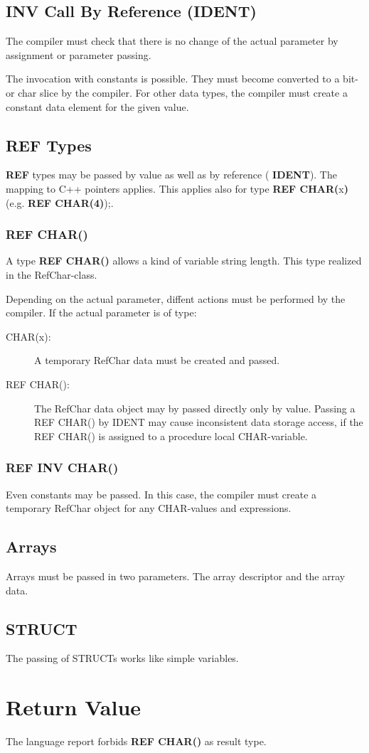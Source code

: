 \subsection{INV Call By Reference (IDENT)}
\label{sec_inv_ident}
The compiler must check that there is no change of the actual parameter
by assignment or parameter passing.

The invocation with constants is possible. They must become converted 
to a bit- or char slice by the compiler. For other data types, the compiler
must create a constant data element for the given value.

\subsection{REF Types}
\textbf{REF} types may be passed by value as well as by reference 
( \textbf{IDENT}).
The mapping to C++ pointers applies.
This applies also for type \textbf{REF CHAR(}x\textbf{)}
 (e.g. \textbf{REF CHAR(4)});.

\subsubsection{REF CHAR()}
A type \textbf{REF CHAR()} allows a kind of variable string length.
This type realized in the RefChar-class. 

Depending on the actual parameter, diffent actions must be performed 
by the compiler. If the actual parameter is of type:
\begin{description}
\item[CHAR(x):] A temporary RefChar data must be created and passed.
\item[REF CHAR():] The RefChar data object may by passed directly 
   only by value. Passing a REF CHAR() by IDENT may cause inconsistent
   data storage access, if the REF CHAR() is assigned to a procedure
   local CHAR-variable.
\end{description}

\subsubsection{REF INV CHAR()}
Even constants may be passed. In this case, the compiler must create
a temporary RefChar object for any CHAR-values and expressions.

\subsection{Arrays}
Arrays must be passed in two parameters. The array descriptor and the 
array data.


 

\subsection{STRUCT}
The passing of STRUCTs works like simple variables.

\section{Return Value}
The language report forbids \textbf{REF CHAR()} as result type.


